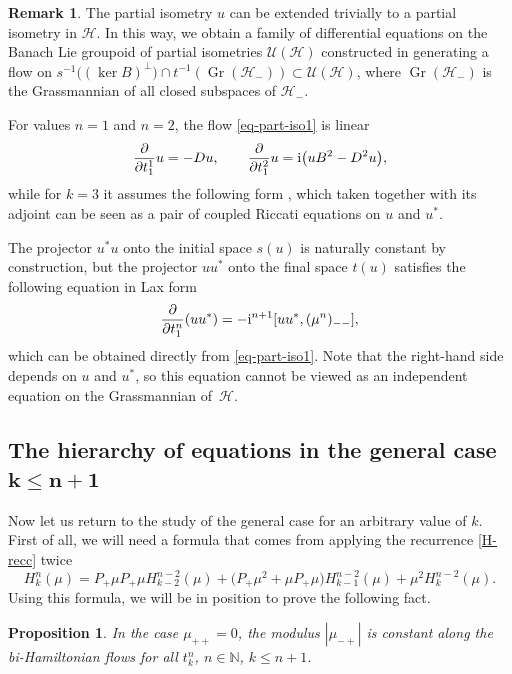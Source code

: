\documentclass[pdftex]{sigma}
\newtheorem{prop}[thm]{Proposition}
\theoremstyle{definition}
\newtheorem{rem}[thm]{Remark}
\numberwithin{equation}{section}
\newcommand{\N}{\mathbb N}
\renewcommand{\H}{\mathcal{H}}
\newcommand{\UU}{\mathcal U(\H)}
\newcommand{\abs}[1]{\left\vert#1\right\vert}
\newcommand{\be}{\begin{equation}}
\newcommand{\ee}{\end{equation}}
\begin{document}
\begin{rem}
 The partial isometry $u$ can be extended trivially to a partial isometry in $\H$. In this way, we obtain a family of differential equations on the Banach Lie groupoid of partial isometries $\UU$ constructed in \cite{OS} generating a flow on
$s^{-1}\bigl((\ker B)^\perp\bigr)\cap t^{-1}(\operatorname{Gr}(\H_-))\subset \UU$, where $\operatorname{Gr}(\H_-)$ is the Grassmannian of all closed subspaces of $\H_-$.
\end{rem}
For values $n=1$ and $n=2$, the flow \eqref{eq-part-iso1} is linear
\begin{gather*} \frac\partial{\partial t^1_1} u = -Du,\qquad
\frac\partial{\partial t^2_1} u = {\rm i}\bigl(uB^2-D^2u\bigr),
\end{gather*}
while for $k=3$ it assumes the following form
,
which taken together with its adjoint can be seen as a pair of coupled Riccati equations on $u$ and $u^*$.

The projector $u^*u$ onto the initial space $s(u)$ is naturally constant by construction, but the projector $uu^*$ onto the final space $t(u)$ satisfies the following equation in Lax form
\[
\frac\partial{\partial t^n_1} (uu^*) = -{\rm i}^{n+1} [uu^*,(\mu^{n})_{--}],
\]
which can be obtained directly from \eqref{eq-part-iso1}.
Note that the right-hand side depends on $u$ and $u^*$, so this equation cannot be viewed as an independent equation on the Grassmannian of~$\H$.

\subsection[The hierarchy of equations in the general case k<= n+1]{The hierarchy of equations in the general case $\boldsymbol{k\leq n+1}$}

Now let us return to the study of the general case for an arbitrary value of $k$. First of all, we will need a formula that comes from applying the recurrence \eqref{H-recc} twice
\be \label{H-recc2}H^n_k(\mu)= P_+\mu P_+ \mu H^{n-2}_{k-2}(\mu) +
\bigl(P_+\mu^2 + \mu P_+ \mu \bigr) H^{n-2}_{k-1}(\mu) + \mu^2 H^{n-2}_{k}(\mu).\ee
Using this formula, we will be in position to prove the following fact.

\begin{prop}
In the case $\mu_{++}=0$, the modulus $\abs{\mu_{-+}}$ is constant along the bi-Hamiltonian flows for all $t^n_k$, $n\in \N$, $k\leq n+1$.
\end{prop}
\end{document}
